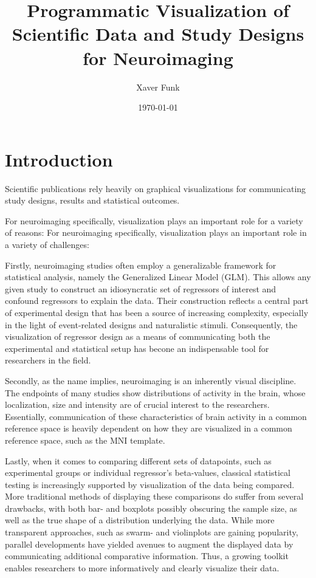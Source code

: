 \documentclass[12pt, letterpaper]{article}
\title{Programmatic Visualization of Scientific Data and Study Designs for Neuroimaging}
\author{Xaver Funk}
\date{\today}
\begin{document}
\maketitle
\section{Introduction}

Scientific publications rely heavily on graphical visualizations for communicating study designs, results and statistical outcomes. %


For neuroimaging specifically, visualization plays an important role for a variety of reasons: 
For neuroimaging specifically, visualization plays an important role in a variety of challenges:


Firstly, neuroimaging studies often employ a generalizable framework for statistical analysis, namely the Generalized Linear Model (GLM). This allows any given study to construct an idiosyncratic set of regressors of interest and confound regressors to explain the data. Their construction reflects a central part of experimental design that has been a source of increasing complexity, especially in the light of event-related designs and naturalistic stimuli. Consequently, the visualization of regressor design as a means of communicating both the experimental and statistical setup has becone an indispensable tool for researchers in the field.

Secondly, as the name implies, neuroimaging is an inherently visual discipline. The endpoints of many studies show distributions of activity in the brain, whose localization, size and intensity are of crucial interest to the researchers. Essentially, communication of these characteristics of brain activity in a common reference space is heavily dependent on how they are visualized in a common reference space, such as the MNI template.

Lastly, when it comes to comparing different sets of datapoints, such as experimental groups or individual regressor's beta-values, classical statistical testing is increasingly supported by visualization of the data being compared. More traditional methods of displaying these comparisons do suffer from several drawbacks, with both bar- and boxplots possibly obscuring the sample size, as well as the true shape of a distribution underlying the data. While more transparent approaches, such as swarm- and violinplots are gaining popularity, parallel developments have yielded avenues to augment the displayed data by communicating additional comparative information. Thus, a growing toolkit enables researchers to more informatively and clearly visualize their data.
\end{document}

